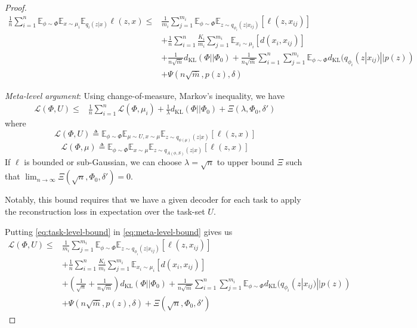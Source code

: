 \documentclass[letterpaper]{article}
\theoremstyle{definition}
\begin{document}
\begin{proof}
\begin{equation} \label{eq:task-level-bound}
\begin{split}
    \frac{1}{n}\sum_{i=1}^{n}\mathbb{E}_{\phi\sim \Phi}\mathbb{E}_{x\sim \mu_i}\mathbb{E}_{q_i(z|x)}\ell(z, x)\leq &\frac{1}{m_i}\sum_{j=1}^{m_i}\mathbb{E}_{\phi\sim \Phi}\mathbb{E}_{z\sim q_{\phi_i}(z|x_{ij})}[\ell(z,x_{ij})] \\
    &+\frac{1}{n}\sum_{i=1}^{n}\frac{K_i}{m_i}\sum_{j=1}^{m_i}\mathbb{E}_{x_i\sim \mu_i}[d(x_i,x_{ij})] \\
    &+ \frac{1}{n\sqrt{\bar{m}}}d_{\mathrm{KL}}(\Phi||\Phi_0) + \frac{1}{n\sqrt{\bar{m}}}\sum_{i=1}^{n}\sum_{j=1}^{m_i}\mathbb{E}_{\phi\sim \Phi}d_{\mathrm{KL}}(q_{\phi_i}(z|x_{ij})||p(z)) \\
    &+ \Psi(n\sqrt{\bar{m}}, p(z), \delta)
\end{split}
\end{equation}

\emph{Meta-level argument}:
Using change-of-measure, Markov's inequality, we have 
\begin{equation} \label{eq:meta-level-bound}
\begin{split}
    \mathcal{L}(\Phi, U)\leq &\frac{1}{n}\sum_{i=1}^{n}\mathcal{L}(\Phi, \mu_i) + \frac{1}{\lambda}d_{\mathrm{KL}}(\Phi||\Phi_0) + \Xi(\lambda,\Phi_0, \delta')
\end{split}
\end{equation}
where $$\mathcal{L}(\Phi, U)\triangleq \mathbb{E}_{\phi\sim \Phi}\mathbb{E}_{\mu\sim U, x\sim \mu}\mathbb{E}_{z\sim q_{\phi(\mu)}(z|x)}\left [\ell(z,x) \right ]$$
$$\mathcal{L}(\Phi, \mu)\triangleq \mathbb{E}_{\phi\sim \Phi}\mathbb{E}_{x\sim \mu}\mathbb{E}_{z\sim q_{A(\phi,S)}(z|x)}\left [\ell(z,x) \right ]$$
If $\ell$ is bounded or sub-Gaussian, we can choose $\lambda=\sqrt{n}$ to upper bound $\Xi$ such that $\lim_{n\rightarrow \infty}\Xi(\sqrt{n},\Phi_0, \delta')=0$.

Notably, this bound requires that we have a given decoder for each task to apply the reconstruction loss in expectation over the task-set $U$.

Putting \eqref{eq:task-level-bound} in \eqref{eq:meta-level-bound} gives us 
\begin{equation*} 
\begin{split}
    \mathcal{L}(\Phi, U)\leq &\frac{1}{m_i}\sum_{j=1}^{m_i}\mathbb{E}_{\phi\sim \Phi}\mathbb{E}_{z\sim q_{\phi_i}(z|x_{ij})}[\ell(z,x_{ij})] \\
    &+\frac{1}{n}\sum_{i=1}^{n}\frac{K_i}{m_i}\sum_{j=1}^{m_i}\mathbb{E}_{x_i\sim \mu_i}[d(x_i,x_{ij})] \\
    &+ \left (\frac{1}{\sqrt{n}}+\frac{1}{n\sqrt{\bar{m}}}\right )d_{\mathrm{KL}}(\Phi||\Phi_0) + \frac{1}{n\sqrt{\bar{m}}}\sum_{i=1}^{n}\sum_{j=1}^{m_i}\mathbb{E}_{\phi\sim \Phi}d_{\mathrm{KL}}(q_{\phi_i}(z|x_{ij})||p(z)) \\
    &+ \Psi(n\sqrt{\bar{m}}, p(z), \delta) 
     + \Xi(\sqrt{n},\Phi_0, \delta')
\end{split}
\end{equation*}
\end{proof}
\end{document}
